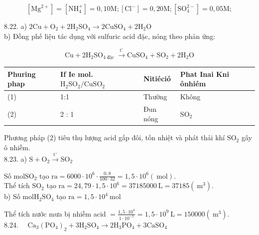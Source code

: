 \documentclass[10pt]{article}
\begin{document}
\begin{equation*}
\left[\mathrm{Mg}^{2+}\right]=\left[\mathrm{NH}_{4}^{+}\right]=0,10 \mathrm{M} ;\left[\mathrm{Cl}^{-}\right]=0,20 \mathrm{M} ;\left[\mathrm{SO}_{4}^{2-}\right]=0,05 \mathrm{M} ; \tag{1}
\end{equation*}


8.22. a) $2 \mathrm{Cu}+\mathrm{O}_{2}+2 \mathrm{H}_{2} \mathrm{SO}_{4} \longrightarrow 2 \mathrm{CuSO}_{4}+2 \mathrm{H}_{2} \mathrm{O}$\\
b) Đồng phế liệu tác dụng với sulfuric acid đặc, nóng theo phản ứng:


\begin{equation*}
\mathrm{Cu}+2 \mathrm{H}_{2} \mathrm{SO}_{4 \text { đặc }} \xrightarrow{\mathrm{t}^{\circ}} \mathrm{CuSO}_{4}+\mathrm{SO}_{2}+2 \mathrm{H}_{2} \mathrm{O} \tag{2}
\end{equation*}


\begin{center}
\begin{tabular}{|l|l|l|l|}
\hline
Phuring phap & If Ie mol. $\mathrm{H}_{2} \mathrm{SO}_{2} / \mathrm{CuSO}_{2}$ & Nitiéció & Phat Inai Kni ônhiém \\
\hline
(1) & 1:1 & Thường & Không \\
\hline
(2) & 2 : 1 & Đun nóng & $\mathrm{SO}_{2}$ \\
\hline
\end{tabular}
\end{center}

Phương pháp (2) tiêu thụ lượng acid gấp đôi, tốn nhiệt và phát thải khí $\mathrm{SO}_{2}$ gây ô nhiễm.\\
8.23. a) $\mathrm{S}+\mathrm{O}_{2} \xrightarrow{\mathrm{t}^{\circ}} \mathrm{SO}_{2}$

Số $\mathrm{mol} \mathrm{SO}_{2}$ tạo $\mathrm{ra}=6000 \cdot 10^{6} \cdot \frac{0,8}{100 \cdot 32}=1,5 \cdot 10^{6}(\mathrm{~mol})$.\\
Thể tích $\mathrm{SO}_{2}$ tạo $\mathrm{ra}=24,79 \cdot 1,5 \cdot 10^{6}=37185000 \mathrm{~L}=37185\left(\mathrm{~m}^{3}\right)$.\\
b) Số $\mathrm{mol} \mathrm{H}_{2} \mathrm{SO}_{4}$ tạo $\mathrm{ra}=1,5 \cdot 10^{4} \mathrm{~mol}$

Thể tích nước mưa bị nhiễm acid $=\frac{1,5 \cdot 10^{4}}{1 \cdot 10^{-5}}=1,5 \cdot 10^{9} \mathrm{~L}=150000\left(\mathrm{~m}^{3}\right)$.\\
8.24. $\quad \mathrm{Ca}_{3}\left(\mathrm{PO}_{4}\right)_{2}+3 \mathrm{H}_{2} \mathrm{SO}_{4} \longrightarrow 2 \mathrm{H}_{3} \mathrm{PO}_{4}+3 \mathrm{CaSO}_{4}$
\end{document}
